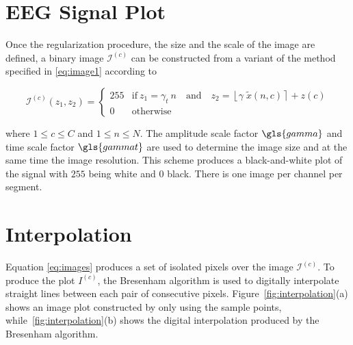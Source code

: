 \section{EEG Signal Plot}
\label{Plot}

Once the regularization procedure,  the size and the scale of the image are defined,  a binary image $\mathcal{I}^{(c)}$ can be constructed from a variant of the method specified in \ref{eq:image1} according to

\begin{equation}
\mathcal{I}^{(c)}(z_1,z_2) = \left\{ \begin{array}{rl}
255 & \text{if} \   z_1 = \gamma_{t} \  n \quad \text{and}  \quad z_2 = \left\lfloor \gamma \; \tilde{x}(n,c) \right\rceil + z(c) \\
0   & \mbox{otherwise}
\end{array}\right.
\label{eq:images}
\end{equation}

\noindent  where  $1 \leq c \leq C$ and $1 \leq n \leq N$. The amplitude scale factor $\gls{gamma}$ and time scale factor $\gls{gammat}$ are used to determine the image size and at the same time the image resolution. This scheme produces a black-and-white plot of the signal with $255$ being white and $0$ black.  There is one image per channel per segment. 


\section{Interpolation}

Equation \ref{eq:images} produces a set of isolated pixels over the image $\mathcal{I}^{(c)}$.  To produce the plot $I^{(c)}$, the Bresenham \cite{Bresenham1965,Ramele2016} algorithm is used to digitally interpolate straight lines between each pair of consecutive pixels.  Figure~\ref{fig:interpolation}(a) shows an image plot constructed by only using the sample points, while~\ref{fig:interpolation}(b) shows the digital interpolation produced by the Bresenham algorithm.

